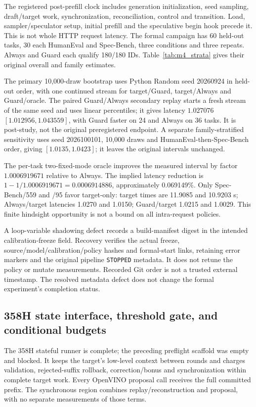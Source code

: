 The registered post-prefill clock includes generation initialization, seed sampling, draft/target work, synchronization, reconciliation, control and transition. Load, sampler/speculator setup, initial prefill and the speculative begin hook precede it. This is not whole HTTP request latency. The formal campaign has 60 held-out tasks, 30 each HumanEval and Spec-Bench, three conditions and three repeats. Always and Guard each qualify 180/180 IDs. Table~\ref{tab:m4_strata} gives their original overall and family estimates.



The primary 10,000-draw bootstrap uses Python Random seed 20260924 in held-out order, with one continued stream for target/Guard, target/Always and Guard/oracle. The paired Guard/Always secondary replay starts a fresh stream of the same seed and uses linear percentiles; it gives latency $1.027076$ $[1.012956,1.043559]$, with Guard faster on 24 and Always on 36 tasks. It is post-study, not the original preregistered endpoint. A separate family-stratified sensitivity uses seed 2026100101, 10,000 draws and HumanEval-then-Spec-Bench order, giving $[1.0135,1.0423]$; it leaves the original intervals unchanged.

The per-task two-fixed-mode oracle improves the measured interval by factor $1.0006919671$ relative to Always. The implied latency reduction is $1-1/1.0006919671=0.0006914886$, approximately 0.069149\%. Only Spec-Bench/559 and /95 favor target-only: target times are 11.9085 and 10.9203 s; Always/target latencies 1.0270 and 1.0150; Guard/target 1.0215 and 1.0029. This finite hindsight opportunity is not a bound on all intra-request policies.

A loop-variable shadowing defect records a build-manifest digest in the intended calibration-freeze field. Recovery verifies the actual freeze, source/model/calibration/policy hashes and formal-start links, retaining error markers and the original pipeline \texttt{STOPPED} metadata. It does not retune the policy or mutate measurements. Recorded Git order is not a trusted external timestamp. The resolved metadata defect does not change the formal experiment's completion status.

\subsection{358H state interface, threshold gate, and conditional budgets}
\label{supp:358h_budgets}
The 358H stateful runner is complete; the preceding preflight scaffold was empty and blocked. It keeps the target's low-level context between rounds and charges validation, rejected-suffix rollback, correction/bonus and synchronization within complete target work. Every OpenVINO proposal call receives the full committed prefix. The synchronous region combines replay/reconstruction and proposal, with no separate measurements of those terms.

